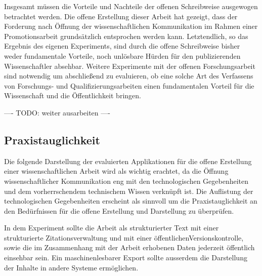 Insgesamt müssen die Vorteile und Nachteile der offenen Schreibweise ausgewogen betrachtet werden. Die offene Erstellung dieser Arbeit hat gezeigt, dass der Forderung nach Öffnung der wissenschaftlichen Kommunikation im Rahmen einer Promotionsarbeit grundsätzlich entsprochen werden kann. Letztendlich, so das Ergebnis des eigenen Experiments, sind durch die offene Schreibweise bisher weder fundamentale Vorteile, noch unlösbare Hürden für den publizierenden Wissenschaftler absehbar. Weitere Experimente mit der offenen Forschungsarbeit sind notwendig um abschließend zu evaluieren, ob eine solche Art des Verfassens von Forschungs- und Qualifizierungsarbeiten einen fundamentalen Vorteil für die Wissenschaft und die Öffentlichkeit bringen.

---- TODO: weiter ausarbeiten ----

\subsection{Praxistauglichkeit}

Die folgende Darstellung der evaluierten Applikationen für die offene Erstellung einer wissenschaftlichen Arbeit wird als wichtig erachtet, da die Öffnung wissenschaftlicher Kommunikation eng mit den technologischen Gegebenheiten \cite{naeder_2010_open} und dem vorherrschendem technischem Wissen verknüpft ist. Die Auflistung der technologischen Gegebenheiten erscheint als sinnvoll um die Praxistauglichkeit an den Bedürfnissen für die offene Erstellung und Darstellung zu überprüfen.

In dem Experiment sollte die Arbeit als strukturierter Text mit einer strukturierte Zitationsverwaltung und mit einer öffentlichenVersionskontrolle, sowie die im Zusammenhang mit der Arbeit erhobenen Daten jederzeit öffentlich einsehbar sein. Ein maschinenlesbarer Export sollte ausserdem die Darstellung der Inhalte in andere Systeme ermöglichen.

